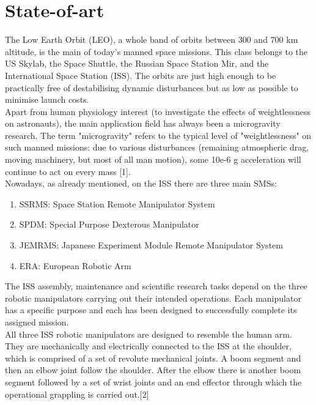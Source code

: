 \documentclass[a4paper,12pt,oneside]{report}
\begin{document}
\section{State-of-art}\label{state_of_art}
The Low Earth Orbit (LEO), a whole band of orbits between 300 and 700 km altitude, is the main of today's manned space missions. This class belongs to the US Skylab, the Space Shuttle, the Russian Space Station Mir, and the International Space Station (ISS). The orbits are just high enough to be practically free of destabilising dynamic disturbances but as low as possible to minimise launch costs.\\
Apart from human physiology interest (to investigate the effects of weightlessness on astronauts), the main application field has always been a microgravity research. The term "microgravity" refers to the typical level of "weightlessness" on such manned missions: due to various disturbances (remaining atmospheric drag, moving machinery, but most of all man motion), some 10e-6 g acceleration will continue to act on every mass [1].\\
Nowadays, as already mentioned, on the ISS there are three main SMSs:
\begin{enumerate}
  \item SSRMS: Space Station Remote Manipulator System
  \item SPDM: Special Purpose Dexterous Manipulator
  \item JEMRMS: Japanese Experiment Module Remote Manipulator System
  \item ERA: European Robotic Arm
\end{enumerate}
The ISS assembly, maintenance and scientific research tasks depend on the three robotic manipulators carrying out their intended operations. Each manipulator has a specific purpose and each has been designed to successfully complete its assigned mission.\\
All three ISS robotic manipulators are designed to resemble the human arm. They are mechanically and electrically connected to the ISS at the shoulder, which is comprised of a set of revolute mechanical joints. A boom segment and then an elbow joint follow the shoulder. After the elbow there is another boom segment followed by a set of wrist joints and an end effector through which the operational grappling is carried out.[2]
\end{document}
